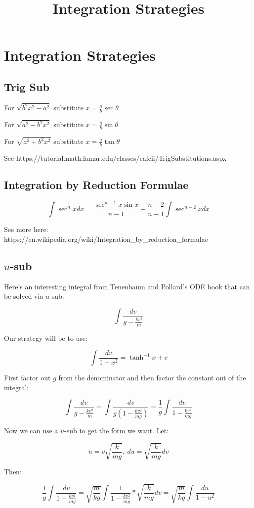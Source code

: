 \documentclass{article}
\title{Integration Strategies}
\begin{document}
\section{Integration Strategies}

\subsection{Trig Sub}

For $\sqrt{b^2x^2 - a^2}$ substitute $x= \frac{a}{b}\sec{\theta}$

For $\sqrt{a^2 - b^2x^2}$ substitute $x= \frac{a}{b}\sin{\theta}$

For $\sqrt{a^2 + b^2x^2}$ substitute $x= \frac{a}{b}\tan{\theta}$

See https://tutorial.math.lamar.edu/classes/calcii/TrigSubstitutions.aspx

\subsection{Integration by Reduction Formulae}

\[ \int{\sec^n{x}dx} = \frac{\sec^{n-1}{x}\sin{x}}{n-1} + \frac{n-2}{n-1}\int{\sec^{n-2}{x}}dx \]

See more here: https://en.wikipedia.org/wiki/Integration\_by\_reduction\_formulae

\subsection{$u$-sub}

Here's an interesting integral from Tenenbaum and Pollard's ODE book that can be solved via $u$-sub:

\[ \tag{a} \int{\frac{dv}{g-\frac{kv^2}{m}}} \]

Our strategy will be to use:

\[ \tag{b} \int{\frac{dv}{1-x^2}} = \tanh^{-1}x + c \]

First factor out $g$ from the denominator and then factor the constant out of the integral:

\[ \tag{c} \int{\frac{dv}{g-\frac{kv^2}{m}}} = \int{\frac{dv}{g(1-\frac{kv^2}{mg})}} = \frac{1}{g}\int{\frac{dv}{1-\frac{kv^2}{mg}}} \]

Now we can use a $u$-sub to get the form we want. Let:

\[ \tag{d} u = v\sqrt{\frac{k}{mg}},~du = \sqrt{\frac{k}{mg}}dv \]

Then:

\[ \tag{e} \frac{1}{g}\int{\frac{dv}{1-\frac{kv^2}{mg}}} = \sqrt{\frac{m}{kg}}\int{\frac{1}{1-\frac{kv^2}{mg}} * \sqrt{\frac{k}{mg}} dv} = \sqrt{\frac{m}{kg}}\int{\frac{du}{1-u^2}} \]
\end{document}
